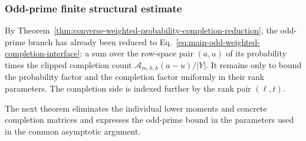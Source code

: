 \documentclass[11pt]{article}
\newcommand{\1}{\mathbf 1}
\theoremstyle{plain}
\theoremstyle{definition}
\theoremstyle{remark}
\begin{document}
\subsubsection{Odd-prime finite structural estimate}
\label{sec:odd-prime-finite-structural-estimate}

By Theorem~\ref{thm:converse-weighted-probability-completion-reduction}, the
odd-prime branch has already been reduced to
Eq.~\eqref{eq:main-odd-weighted-completion-interface}: a sum over the
row-space pair $(a,u)$ of its probability times the clipped completion count
$\mathcal A_{m,h,k}(a-u)/\lvert Y\rvert$.  It remains only to bound the probability
factor and the completion factor uniformly in their rank parameters.  The
completion side is indexed further by the rank pair $(\ell,t)$.

The next theorem eliminates the individual lower moments and concrete
completion matrices and expresses the odd-prime bound in the parameters used
in the common asymptotic argument.
\end{document}
